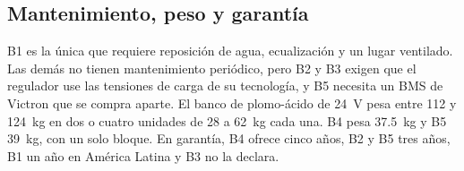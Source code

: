\subsection{Mantenimiento, peso y garantía}

B1 es la única que requiere reposición de agua, ecualización y un lugar ventilado. Las demás no tienen mantenimiento periódico, pero B2 y B3 exigen que el regulador use las tensiones de carga de su tecnología, y B5 necesita un BMS de Victron que se compra aparte. El banco de plomo-ácido de \SI{24}{V} pesa entre 112 y \SI{124}{kg} en dos o cuatro unidades de 28 a \SI{62}{kg} cada una. B4 pesa \SI{37.5}{kg} y B5 \SI{39}{kg}, con un solo bloque. En garantía, B4 ofrece cinco años, B2 y B5 tres años, B1 un año en América Latina y B3 no la declara.
